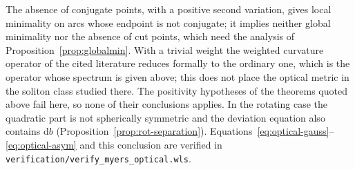 \documentclass[12pt]{iopart}
\theoremstyle{plain}
\theoremstyle{definition}
\theoremstyle{remark}
\newcommand{\dd}{\mathrm{d}}
\begin{document}
The absence of conjugate points, with a positive second variation, gives local
minimality on arcs whose endpoint is not conjugate; it implies neither global minimality
nor the absence of cut points, which need the analysis of
Proposition~\ref{prop:globalmin}. With a trivial weight the weighted curvature
operator of the cited literature reduces formally to the ordinary one, which is the
operator whose spectrum is given above; this does not place the optical metric in the
soliton class studied there. The positivity hypotheses of the theorems quoted above fail
here, so none of their conclusions applies. In the
rotating case the quadratic part is not spherically symmetric and the deviation
equation also contains $\dd b$ (Proposition~\ref{prop:rot-separation}). Equations~\eqref{eq:optical-gauss}--\eqref{eq:optical-asym}
and this conclusion are verified in
\texttt{verification/verify\_myers\_optical.wls}.
\end{document}
